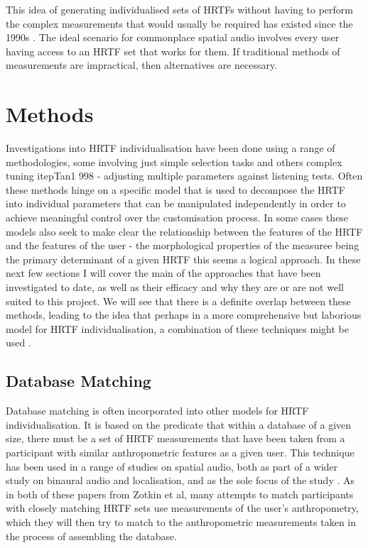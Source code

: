 
This idea of generating individualised sets of HRTFs without having to perform the complex measurements that would usually be required has existed since the 1990s \citep{Kulkarni1995}. The ideal scenario for commonplace spatial audio involves every user having access to an HRTF set that works for them. If traditional methods of measurements are impractical, then alternatives are necessary.

\section{Methods}
Investigations into HRTF individualisation have been done using a range of methodologies, some involving just simple selection tasks \citep{Zotkin2002} and others complex tuning itep{Tan1	998} - adjusting multiple parameters against listening tests. Often these methods hinge on a specific model that is used to decompose the HRTF into individual parameters that can be manipulated independently in order to achieve meaningful control over the customisation process. In some cases these models also seek to make clear the relationship between the features of the HRTF and the features of the user - the morphological properties of the measuree being the primary determinant of a given HRTF this seems a logical approach. In these next few sections I will cover the main of the approaches that have been investigated to date, as well as their efficacy and why they are or are not well suited to this project. We will see that there is a definite overlap between these methods, leading to the idea that perhaps in a more comprehensive but laborious model for HRTF individualisation, a combination of these techniques might be used \citep{Hoene2017}.

\subsection{Database Matching}
Database matching is often incorporated into other models for HRTF individualisation. It is based on the predicate that within a database of a given size, there must be a set of HRTF measurements that have been taken from a participant with similar anthropometric features as a given user. This technique has been used in a range of studies on spatial audio, both as part of a wider study on binaural audio and localisation, \citep{Zotkin2002} and as the sole focus of the study \citep{Zotkin}. As in both of these papers from Zotkin et al, many attempts to match participants with closely matching HRTF sets use measurements of the user's anthropometry, which they will then try to match to the anthropometric measurements taken in the process of assembling the database. 

